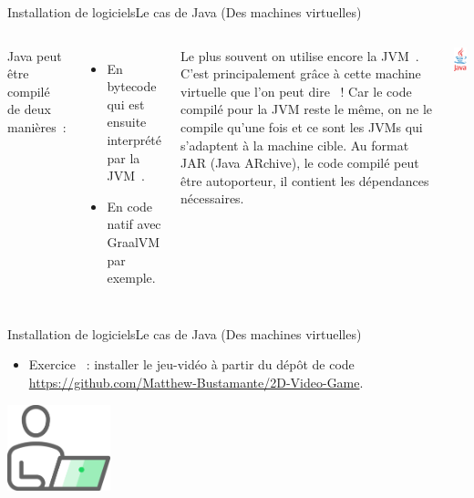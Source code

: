 \documentclass{beamer}
\begin{document}
    \begin{frame}{Installation de logiciels}{Le cas de Java (Des machines virtuelles)}
        \begin{columns}
            Java peut être compilé de deux manières~:
            \begin{itemize}
                \item En bytecode qui est ensuite interprété par la JVM~.
                \item En code natif avec GraalVM par exemple.
            \end{itemize}
            Le plus souvent on utilise encore la JVM~.
            C'est principalement grâce à cette machine virtuelle que l'on peut dire ~!
            \bigbreak
            Car le code compilé pour la JVM reste le même, on ne le compile qu'une fois et ce sont les JVMs qui s'adaptent à la machine cible.
            Au format JAR (Java ARchive), le code compilé peut être autoporteur, il contient les dépendances nécessaires.
            \begin{center}
                \includegraphics[width=3cm]{image/java-logo}
            \end{center}
        \end{columns}
    \end{frame}

    \begin{frame}{Installation de logiciels}{Le cas de Java (Des machines virtuelles)}
        \begin{itemize}
            \item Exercice \execcounterdispinc{}~: installer le jeu-vidéo à partir du dépôt de code \url{https://github.com/Matthew-Bustamante/2D-Video-Game}.
        \end{itemize}
        \bigbreak
        \centering
        \includegraphics[width=3cm]{image/guy-in-front-of-desktop}
    \end{frame}
\end{document}
